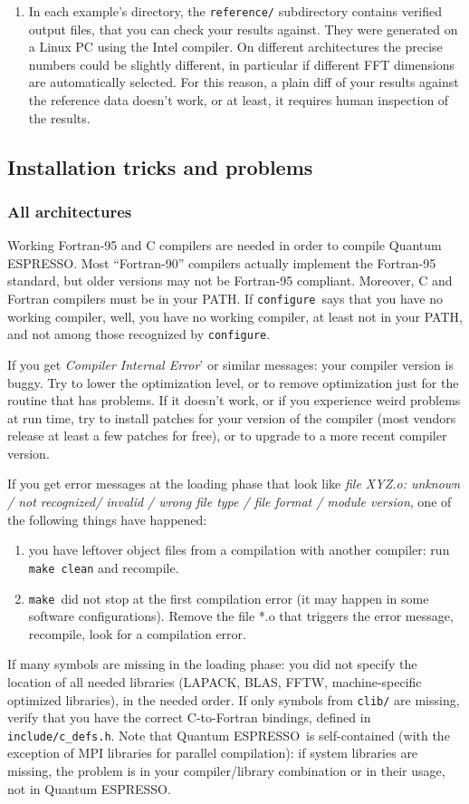 \documentclass[12pt,a4paper]{article}
\def\qe{{\sc Quantum ESPRESSO}}
\def\configure{\texttt{configure}}
\def\make{\texttt{make}}
\begin{document}
\begin{enumerate}
\item In each example's directory, the \texttt{reference/} subdirectory contains
verified output files, that you can check your results against. They
were generated on a Linux PC using the Intel compiler. On different
architectures the precise numbers could be slightly different, in
particular if different FFT dimensions are automatically selected. For
this reason, a plain diff of your results against the reference data
doesn't work, or at least, it requires human inspection of the
results. 
\end{enumerate}


\subsection{Installation tricks and problems}

\subsubsection{All architectures}

Working Fortran-95 and C compilers are needed in order
to compile \qe. Most ``Fortran-90'' compilers actually
implement the Fortran-95 standard, but older versions 
may not be Fortran-95 compliant. Moreover, 
C and Fortran compilers must be in your PATH.
If \configure\ says that you have no working compiler, well,
you have no working compiler, at least not in your PATH, and
not among those recognized by \configure.

If you get {\em Compiler Internal Error}' or similar messages: your
compiler version is buggy. Try to lower the optimization level, or to
remove optimization just for the routine that has problems. If it
doesn't work, or if you experience weird problems at run time, try to 
install patches for your version of the compiler (most vendors release
at least a few patches for free), or to upgrade to a more recent
compiler version.

If you get error messages at the loading phase that look like 
{\em file XYZ.o: unknown / not recognized/ invalid / wrong
file type / file format / module version},
one of the following things have happened:
\begin{enumerate}
\item you have leftover object files from a compilation with another
  compiler: run \texttt{make clean} and recompile. 
\item \make\ did not stop at the first compilation error (it may 
happen in some software configurations). Remove the file *.o
that triggers the error message, recompile, look for a 
compilation error. 
\end{enumerate}
If many symbols are missing in the loading phase: you did not specify the
location of all needed libraries (LAPACK, BLAS, FFTW, machine-specific
optimized libraries), in the needed order. 
If only symbols from \texttt{clib/} are missing, verify that
you have the correct C-to-Fortran bindings, defined in 
\texttt{include/c\_defs.h}.
Note that \qe\ is self-contained (with the exception of MPI libraries for 
parallel compilation): if system libraries are missing, the problem is in
your compiler/library combination or in their usage, not in \qe.
\end{document}
